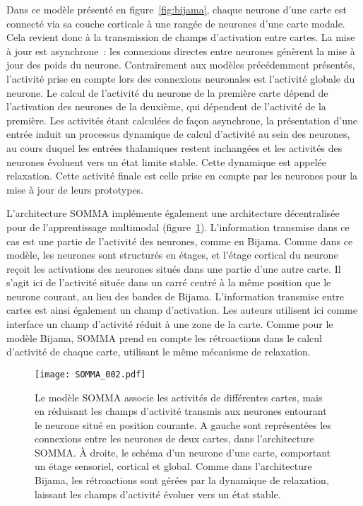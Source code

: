 \documentclass[../main]{subfiles}
\begin{document}
Dans ce modèle présenté en figure~\ref{fig:bijama}, chaque neurone d'une carte est connecté via sa couche corticale à une rangée de neurones d'une carte modale. Cela revient donc à la transmission de champs d'activation entre cartes.
La mise à jour est asynchrone~: les connexions directes entre neurones génèrent la mise à jour des poids du neurone. Contrairement aux modèles précédemment présentés, l'activité prise en compte lors des connexions neuronales est l'activité globale du neurone. Le calcul de l'activité du neurone de la première carte dépend de l'activation des neurones de la deuxième, qui dépendent de l'activité de la première.
Les activités étant calculées de façon asynchrone, la présentation d'une entrée induit un processus dynamique de calcul d'activité au sein des neurones, au cours duquel les entrées thalamiques restent inchangées et les activités des neurones évoluent vers un état limite stable. Cette dynamique est appelée relaxation.
Cette activité finale est celle prise en compte par les neurones pour la mise à jour de leurs prototypes.

L'architecture SOMMA implémente également une architecture décentralisée pour de l'apprentissage multimodal (figure~\ref{fig:somma}).
L'information transmise dans ce cas est une partie de l'activité des neurones, comme en Bijama. Comme dans ce modèle, les neurones sont structurés en étages, et l'étage cortical du neurone reçoit les activations des neurones situés dans une partie d'une autre carte.
Il s'agit ici de l'activité située dans un carré centré à la même position que le neurone courant, au lieu des bandes de Bijama.
L'information transmise entre cartes est ainsi également un champ d'activation. Les auteurs utilisent ici comme interface un champ d'activité réduit à une zone de la carte. Comme pour le modèle Bijama, SOMMA prend en compte les rétroactions dans le calcul d'activité de chaque carte, utilisant le même mécanisme de relaxation.


\begin{figure}
    \centering\texttt{[image: SOMMA\_002.pdf]}
    \caption{
        Le modèle SOMMA \parencite{lefort_unlearning_2011,lefort_apprentissage_2012} associe les activités de différentes cartes, mais en réduisant les champs d'activité transmis aux neurones entourant le neurone situé en position courante. A gauche sont représentées les connexions entre les neurones de deux cartes, dans l'architecture SOMMA. \`A droite, le schéma d'un neurone d'une carte, comportant un étage sensoriel, cortical et global.
        Comme dans l'architecture Bijama, les rétroactions sont gérées par la dynamique de relaxation, laissant les champs d'activité évoluer vers un état stable.
    \label{fig:somma}}
\end{figure}
\end{document}
